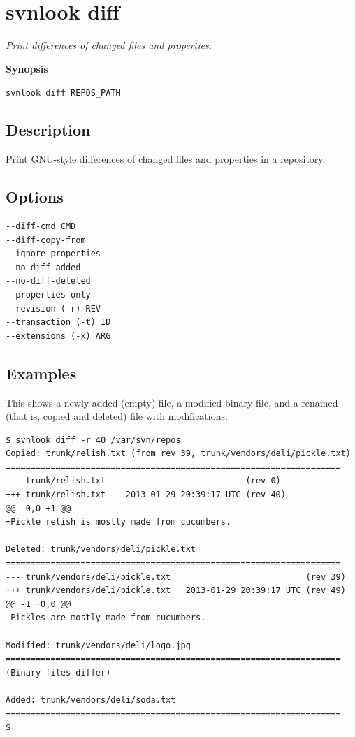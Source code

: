 \section{svnlook diff}\label{svn.ref.svnlook.c.diff}

\emph{Print differences of changed files and properties.}

\textbf{Synopsis}

\texttt{svnlook\ diff\ REPOS\_PATH}

\subsection{Description}

Print GNU-style differences of changed files and properties in a
repository.

\subsection{Options}

\begin{verbatim}
--diff-cmd CMD
--diff-copy-from
--ignore-properties
--no-diff-added
--no-diff-deleted
--properties-only
--revision (-r) REV
--transaction (-t) ID
--extensions (-x) ARG
\end{verbatim}

\subsection{Examples}

This shows a newly added (empty) file, a modified binary file, and a
renamed (that is, copied and deleted) file with modifications:

\begin{verbatim}
$ svnlook diff -r 40 /var/svn/repos
Copied: trunk/relish.txt (from rev 39, trunk/vendors/deli/pickle.txt)
===================================================================
--- trunk/relish.txt                            (rev 0)
+++ trunk/relish.txt    2013-01-29 20:39:17 UTC (rev 40)
@@ -0,0 +1 @@
+Pickle relish is mostly made from cucumbers.

Deleted: trunk/vendors/deli/pickle.txt
===================================================================
--- trunk/vendors/deli/pickle.txt                           (rev 39)
+++ trunk/vendors/deli/pickle.txt   2013-01-29 20:39:17 UTC (rev 49)
@@ -1 +0,0 @@
-Pickles are mostly made from cucumbers.

Modified: trunk/vendors/deli/logo.jpg
===================================================================
(Binary files differ)

Added: trunk/vendors/deli/soda.txt
===================================================================
$
\end{verbatim}

